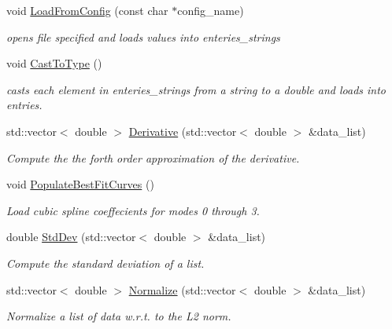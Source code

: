 \begin{DoxyCompactItemize}
\item 
void \hyperlink{class_mode_track_a4e0a0d9430910d77c067c0ee40110200}{Load\-From\-Config} (const char $\ast$config\-\_\-name)
\begin{DoxyCompactList}\small\item\em opens file specified and loads values into enteries\-\_\-strings \end{DoxyCompactList}\item 
\hypertarget{class_mode_track_a992935ab5c2bd97e824a88039238e07f}{void \hyperlink{class_mode_track_a992935ab5c2bd97e824a88039238e07f}{Cast\-To\-Type} ()}\label{class_mode_track_a992935ab5c2bd97e824a88039238e07f}

\begin{DoxyCompactList}\small\item\em casts each element in enteries\-\_\-strings from a string to a double and loads into entries. \end{DoxyCompactList}\item 
std\-::vector$<$ double $>$ \hyperlink{class_mode_track_a8461b01cf1c811aa7cf781fb9bb07f68}{Derivative} (std\-::vector$<$ double $>$ \&data\-\_\-list)
\begin{DoxyCompactList}\small\item\em Compute the the forth order approximation of the derivative. \end{DoxyCompactList}\item 
void \hyperlink{class_mode_track_a5dccdca7cd909c332b5ed1e09118cd98}{Populate\-Best\-Fit\-Curves} ()
\begin{DoxyCompactList}\small\item\em Load cubic spline coeffecients for modes 0 through 3. \end{DoxyCompactList}\item 
double \hyperlink{class_mode_track_afe43b234695b74e5c493acb08aec39b7}{Std\-Dev} (std\-::vector$<$ double $>$ \&data\-\_\-list)
\begin{DoxyCompactList}\small\item\em Compute the standard deviation of a list. \end{DoxyCompactList}\item 
std\-::vector$<$ double $>$ \hyperlink{class_mode_track_ac9749deca774e487cbcc694a56b226cd}{Normalize} (std\-::vector$<$ double $>$ \&data\-\_\-list)
\begin{DoxyCompactList}\small\item\em Normalize a list of data w.\-r.\-t. to the L2 norm. \end{DoxyCompactList}\item 

\end{DoxyCompactItemize}
